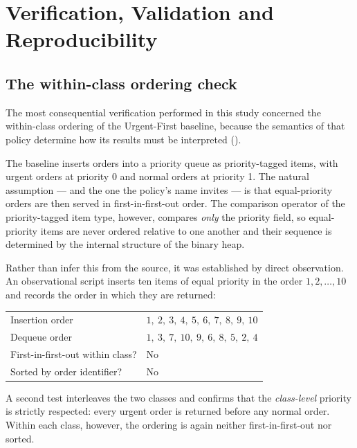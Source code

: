 \chapter{Verification, Validation and Reproducibility}
\label{app:E}

\section{The within-class ordering check}
\label{sec:app-priority-check}

The most consequential verification performed in this study concerned the within-class ordering
of the Urgent-First baseline, because the semantics of that policy determine how its results
must be interpreted ().

The baseline inserts orders into a priority queue as priority-tagged items, with urgent orders
at priority \num{0} and normal orders at priority \num{1}. The natural assumption --- and the
one the policy's name invites --- is that equal-priority orders are then served in
first-in-first-out order. The comparison operator of the priority-tagged item type, however,
compares \emph{only} the priority field, so equal-priority items are never ordered relative to
one another and their sequence is determined by the internal structure of the binary heap.

Rather than infer this from the source, it was established by direct observation. An
observational script inserts ten items of equal priority in the order \(1, 2, \dots, 10\) and
records the order in which they are returned:

\begin{center}
\begin{tabularx}{0.9\textwidth}{lX}
\toprule
Insertion order & \(1,\ 2,\ 3,\ 4,\ 5,\ 6,\ 7,\ 8,\ 9,\ 10\) \\
Dequeue order   & \(1,\ 3,\ 7,\ 10,\ 9,\ 6,\ 8,\ 5,\ 2,\ 4\) \\
\midrule
First-in-first-out within class? & No \\
Sorted by order identifier?      & No \\
\bottomrule
\end{tabularx}
\end{center}

A second test interleaves the two classes and confirms that the \emph{class-level} priority is
strictly respected: every urgent order is returned before any normal order. Within each class,
however, the ordering is again neither first-in-first-out nor sorted.

